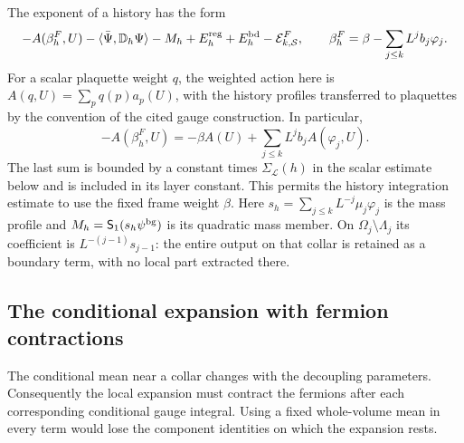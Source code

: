 \documentclass[11pt,letterpaper,reqno]{amsart}
\theoremstyle{definition}
\theoremstyle{remark}
\begin{document}
The exponent of a history has the form
\begin{equation}\label{eq:qcd-history-format}
 -A(\beta_h^F,U)-\langle\bar\Psi,\mathbb D_h\Psi\rangle
 -M_h+E_h^{\rm reg}+E_h^{\rm bd}-\mathcal E^F_{k,\mathcal S},
 \qquad
 \beta_h^F=\beta-\sum_{j\le k}L^jb_j\varphi_j.
\end{equation}
For a scalar plaquette weight $q$, the weighted action here is
$A(q,U)=\sum_pq(p)a_p(U)$, with the history profiles transferred
to plaquettes by the convention of the cited gauge construction.
In particular,
\[
 -A(\beta_h^F,U)=-\beta A(U)
                    +\sum_{j\le k}L^jb_jA(\varphi_j,U).
\]
The last sum is bounded by a constant times
$\Sigma_{\mathcal L}(h)$ in the scalar estimate below and
is included in its layer constant. This permits the history
integration estimate to use the fixed frame weight $\beta$.
Here $s_h=\sum_{j\le k}L^{-j}\mu_j\varphi_j$ is the mass
profile and $M_h=\mathsf S_1(s_h\psi^{\rm bg})$ is its
quadratic mass member. On $\Omega_j\setminus\Lambda_j$ its coefficient is
$L^{-(j-1)}s_{j-1}$: the entire output on that collar is retained
as a boundary term, with no local part extracted there.

\subsection{The conditional expansion with fermion contractions}

The conditional mean near a collar changes with the decoupling
parameters. Consequently the local expansion must contract the
fermions after each corresponding conditional gauge integral.
Using a fixed whole-volume mean in every term would lose the
component identities on which the expansion rests.
\end{document}
